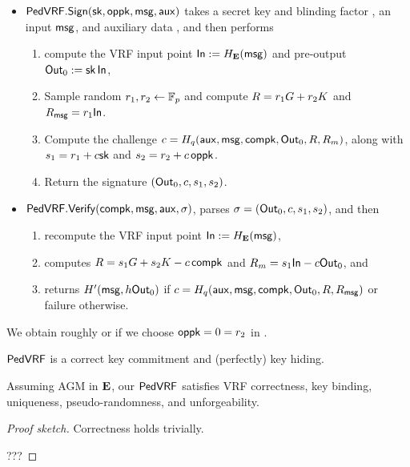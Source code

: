 \begin{itemize}
\item ${\mathsf{PedVRF}}.{\mathsf{Sign}}(\mathsf{sk},\mathsf{oppk},\mathsf{msg},\mathsf{aux})$ takes a secret key \sk and blinding factor \openpk, an input $\mathsf{msg}$, and auxiliary data \aux, and then performs
\begin{enumerate}
    \item compute the VRF input point ${\mathsf{In}} := H_{{\mathbf{E}}}(\mathsf{msg})$ and pre-output ${\mathsf{Out}}_0 := \mathsf{sk} \, {\mathsf{In}}$,
    \item Sample random $r_1,r_2 \leftarrow \mathbb{F}_p$ and compute $R = r_1 G + r_2 K$ and $R_\mathsf{msg} = r_1 {\mathsf{In}}$.
    \item Compute the challenge $c = H_q(\mathsf{aux},\mathsf{msg},\mathsf{compk},{\mathsf{Out}}_0,R,R_m)$,
     along with $s_1 = r_1 + c \mathsf{sk}$ and $s_2 = r_2 + c \, \mathsf{oppk}$.
    \item Return the signature $({\mathsf{Out}}_0,c,s_1,s_2)$.
\end{enumerate}
\item ${\mathsf{PedVRF}}.{\mathsf{Verify}}(\mathsf{compk},\mathsf{msg},\mathsf{aux},\sigma)$, parses $\sigma = ({\mathsf{Out}}_0,c,s_1,s_2)$, and then 
\begin{enumerate}
    \item recompute the VRF input point ${\mathsf{In}} := H_{{\mathbf{E}}}(\mathsf{msg})$,
    \item computes $R = s_1 G + s_2 K - c \, \mathsf{compk}$ and $R_m = s_1 {\mathsf{In}} - c {\mathsf{Out}}_0$, and
    \item returns $H'(\mathsf{msg}, h {\mathsf{Out}}_0)$ if $c = H_q(\mathsf{aux},\mathsf{msg},\mathsf{compk},{\mathsf{Out}}_0,R,R_\mathsf{msg})$ or failure otherwise.
\end{enumerate}
\end{itemize}

We obtain roughly \cite{nsec5} or \cite{VXEd25519}
if we choose $\mathsf{oppk} = 0 = r_2$ in \Sign.


\begin{lemma}\label{prop:pedersen_vrf_hiding}
${\mathsf{PedVRF}}$ is a correct key commitment and (perfectly) key hiding.
\end{lemma}


\begin{proposition}\label{prop:pedersen_vrf}
Assuming AGM in ${\mathbf{E}}$, %
our ${\mathsf{PedVRF}}$ satisfies VRF correctness, key binding, uniqueness,
pseudo-randomness, and unforgeability. %
\end{proposition}



\begin{proof}[Proof sketch]
Correctness holds trivially.

???
\end{proof}



